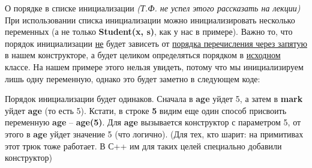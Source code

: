 \begin{lecture}[\lectureSubject]
\begin{lecSection}
			\begin{lecSubsection}{О порядке в списке инициализации}
			\textit{(Т.Ф. не успел этого рассказать на лекции)} При использовании списка инициализации можно инициализировать несколько переменных (а не только \textbf{Student(x, s)}, как у нас в примере). Важно то, что порядок инициализации \underline{не} будет зависеть от \underline{порядка перечисления через запятую} в нашем конструкторе, а будет целиком определяться порядком в \underline{исходном} классе. На нашем примере этого нельзя увидеть, потому что мы инициализируем лишь одну переменную, однако это будет заметно в следующем коде:
			\end{lecSubsection}
			Порядок инициализации будет одинаков. Сначала в \textbf{age} уйдет 5, а затем в \textbf{mark} уйдет \textbf{age} (то есть 5). Кстати, в строке \textbf{5} видим еще один способ присвоить переменную \textbf{age} -- \textbf{age(5)}. Для \textbf{age} вызывается конструктор с параметром 5, от этого в \textbf{age} уйдет значение 5 (что логично). (Для тех, кто шарит: на примитивах этот трюк тоже работает. В С++ им для таких целей специально добавили конструктор)
		
	\end{lecSection}
\end{lecture}

\renewcommand{\mainFolder}{/home/aleksei/github_projects/latex_works/informatics}
\renewcommand{\myFolder}{\mainFolder/lecture_\arabic{lectureNo}/}

\renewcommand{\lectureSubject}{Виртуальные методы}
%



